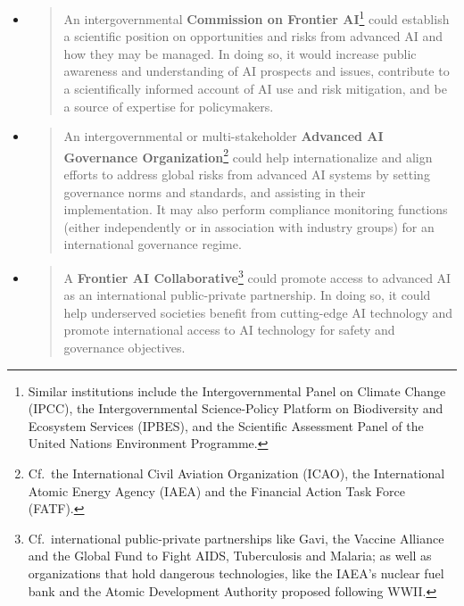 \documentclass[12pt]{article}
\begin{document}
\begin{itemize}
\item
  \begin{quote}
  An intergovernmental \textbf{Commission on Frontier AI}\footnote{Similar
  institutions include the Intergovernmental Panel on Climate Change (IPCC),
    the Intergovernmental Science-Policy Platform on Biodiversity and
    Ecosystem Services (IPBES), and the Scientific Assessment Panel
    of the United Nations Environment Programme.} could establish a scientific position
  on opportunities and risks from advanced AI and how they may be
  managed. In doing so, it would increase public awareness and
  understanding of AI prospects and issues, contribute to a
  scientifically informed account of AI use and risk mitigation, and be
  a source of expertise for policymakers.
  \end{quote}
\item
  \begin{quote}
  An intergovernmental or multi-stakeholder \textbf{Advanced AI
  Governance Organization}\footnote{Cf.\ the International Civil Aviation
    Organization (ICAO), the International Atomic Energy Agency (IAEA)
    and the Financial Action Task Force (FATF).} could help internationalize
  and align efforts to address global risks from advanced AI systems by
  setting governance norms and standards, and assisting in their
  implementation. It may also perform compliance monitoring functions
  (either independently or in association with industry groups) for an
  international governance regime.
  \end{quote}
\end{itemize}

\begin{itemize}
\item
  \begin{quote}
  A \textbf{Frontier AI Collaborative}\footnote{Cf.\ international
    public-private partnerships like Gavi, the Vaccine Alliance and the
    Global Fund to Fight AIDS, Tuberculosis and Malaria; as well as
    organizations that hold dangerous technologies, like the IAEA's
    nuclear fuel bank and the Atomic Development Authority proposed
    following WWII.} could promote access to advanced AI as an
  international public-private partnership. In doing so, it could help
  underserved societies benefit from cutting-edge AI technology and
  promote international access to AI technology for safety and
  governance objectives.
  \end{quote}
\end{itemize}
\end{document}
